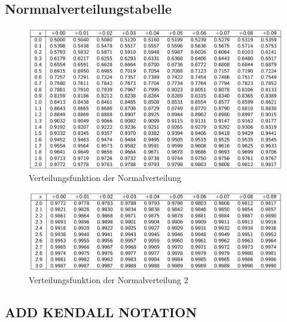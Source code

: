 \documentclass[../Main.tex]{subfiles}
\begin{document}

\subsection{Normnalverteilungstabelle}

\begin{figure}[H]
    \centering
    \includegraphics[width=1\linewidth]{Images/norm-tabelle.png}
    \caption{Verteilungsfunktion der Normalverteilung}
\end{figure}
\begin{figure}[H]
    \centering
    \includegraphics[width=1\linewidth]{Images/norm-tabelle-2.png}
    \caption{Verteilungsfunktion der Normalverteilung 2}
\end{figure}

\subsection{ADD KENDALL NOTATION}
\end{document}

